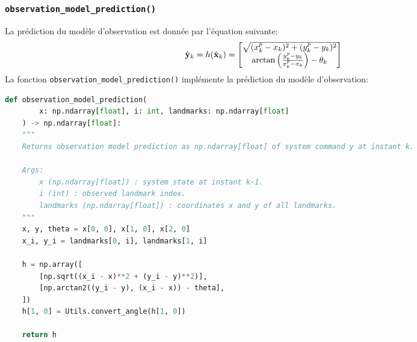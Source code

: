 \documentclass[../CSC_5RO12_TA_TP3.tex]{subfiles}
\begin{document}
\subsubsection{\texttt{observation\_model\_prediction()}}
\begin{definition}
    La prédiction du modèle d'observation est donnée par l'équation suivante:
    \begin{equation}
        \hat{\bf{y}}_{k} = h(\hat{\bf{x}}_{k}) = \begin{bmatrix}
            \sqrt{(x^{p}_{k} - x_{k})^{2} + (y^{p}_{k} - y_{k})^{2}}\\
            \arctan{\left(\frac{y^{p}_{k} - y_{k}}{x^{p}_{k} - x_{k}}\right)} - \theta_{k}
        \end{bmatrix}
    \end{equation}
    La fonction \texttt{observation\_model\_prediction()} implémente la prédiction du modèle d'observation:
    \begin{scriptsize}\mycode
        \begin{lstlisting}[language=Python, caption=\texttt{observation\_model\_prediction()}]
def observation_model_prediction(
        x: np.ndarray[float], i: int, landmarks: np.ndarray[float]
    ) -> np.ndarray[float]:
    """
    Returns observation model prediction as np.ndarray[float] of system command y at instant k.

    Args:
        x (np.ndarray[float]) : system state at instant k-1.
        i (int) : observed landmark index.
        landmarks (np.ndarray[float]) : coordinates x and y of all landmarks.
    """
    x, y, theta = x[0, 0], x[1, 0], x[2, 0]
    x_i, y_i = landmarks[0, i], landmarks[1, i]

    h = np.array([
        [np.sqrt((x_i - x)**2 + (y_i - y)**2)],
        [np.arctan2((y_i - y), (x_i - x)) - theta],
    ])
    h[1, 0] = Utils.convert_angle(h[1, 0])

    return h
        \end{lstlisting}
    \end{scriptsize}
\end{definition}
\end{document}
